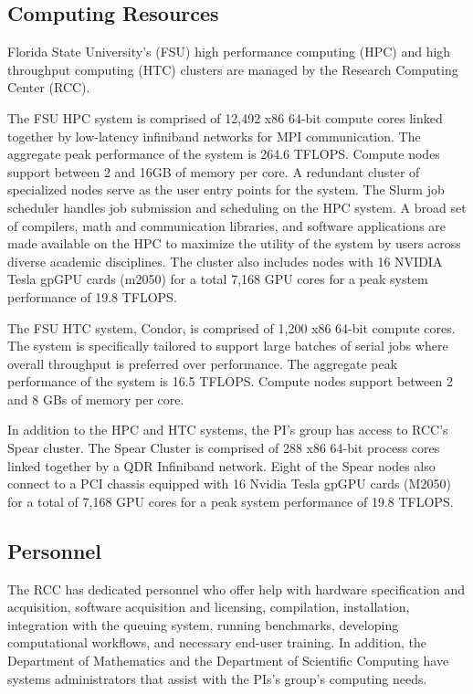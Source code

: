\documentclass[11pt]{article}
\begin{document}
\thispagestyle{fancy}

\subsection*{Computing Resources}
Florida State University's (FSU) high performance computing (HPC) and
high throughput computing (HTC) clusters are managed by the Research
Computing Center (RCC).

The FSU HPC system is comprised of 12,492 x86 64-bit compute cores
linked together by low-latency infiniband networks for MPI
communication. The aggregate peak performance of the system is 264.6
TFLOPS. Compute nodes support between 2 and 16GB of memory per core. A
redundant cluster of specialized nodes serve as the user entry points
for the system. The Slurm job scheduler handles job submission and
scheduling on the HPC system. A broad set of compilers, math and
communication libraries, and software applications are made available on
the HPC to maximize the utility of the system by users across diverse
academic disciplines.  The cluster also includes nodes with 16 NVIDIA
Tesla gpGPU cards (m2050) for a total 7,168 GPU cores for a peak system
performance of 19.8 TFLOPS.

The FSU HTC system, Condor, is comprised of 1,200 x86 64-bit compute
cores.  The system is specifically tailored to support large batches of
serial jobs where overall throughput is preferred over performance.
The aggregate peak performance of the system is 16.5 TFLOPS.  Compute
nodes support between 2 and 8 GBs of memory per core.

In addition to the HPC and HTC systems, the PI's group has access to
RCC's Spear cluster.  The Spear Cluster is comprised of 288 x86 64-bit
process cores linked together by a QDR Infiniband network.  Eight of the
Spear nodes also connect to a PCI chassis equipped with 16 Nvidia Tesla
gpGPU cards (M2050) for a total of 7,168 GPU cores for a peak system
performance of 19.8 TFLOPS. 

\subsection*{Personnel}
The RCC has dedicated personnel who offer help with hardware
specification and acquisition, software acquisition and licensing,
compilation, installation, integration with the queuing system, running
benchmarks, developing computational workflows, and necessary end-user
training.  In addition, the Department of Mathematics and the Department
of Scientific Computing have systems administrators that assist with the
PIs's group's computing needs.
\end{document}
